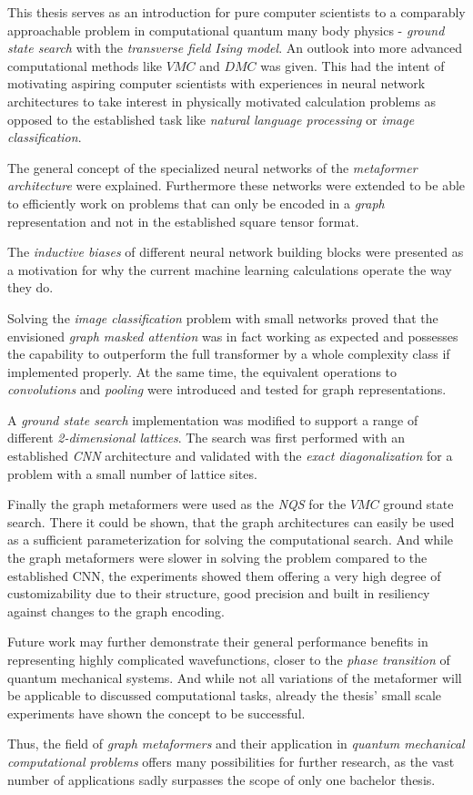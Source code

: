 This thesis serves as an introduction for pure computer scientists to a comparably approachable problem in computational quantum many body physics - \emph{ground state search} with the \emph{transverse field Ising model}.
An outlook into more advanced computational methods like $VMC$ and $DMC$ was given.
This had the intent of motivating aspiring computer scientists with experiences in neural network architectures to take interest in physically motivated calculation problems as opposed to the established task like \emph{natural language processing} or \emph{image classification}.

The general concept of the specialized neural networks of the \emph{metaformer architecture} were explained.
Furthermore these networks were extended to be able to efficiently work on problems that can only be encoded in a \emph{graph} representation and not in the established square tensor format.

The \emph{inductive biases} of different neural network building blocks were presented as a motivation for why the current machine learning calculations operate the way they do.

Solving the \emph{image classification} problem with small networks proved that the envisioned \emph{graph masked attention} was in fact working as expected and possesses the capability to outperform the full transformer by a whole complexity class if implemented properly.
At the same time, the equivalent operations to \emph{convolutions} and \emph{pooling} were introduced and tested for graph representations.

A \emph{ground state search} implementation was modified to support a range of different \emph{2-dimensional lattices}.
The search was first performed with an established \emph{CNN} architecture and validated with the \emph{exact diagonalization} for a problem with a small number of lattice sites.

Finally the graph metaformers were used as the \emph{NQS} for the $VMC$ ground state search.
There it could be shown, that the graph architectures can easily be used as a sufficient parameterization for solving the computational search.
And while the graph metaformers were slower in solving the problem compared to the established CNN, the experiments showed them offering a very high degree of customizability due to their structure, good precision and built in resiliency against changes to the graph encoding.

Future work may further demonstrate their general performance benefits in representing highly complicated wavefunctions, closer to the \emph{phase transition} of quantum mechanical systems.
And while not all variations of the metaformer will be applicable to discussed computational tasks, already the thesis' small scale experiments have shown the concept to be successful.

Thus, the field of \emph{graph metaformers} and their application in \emph{quantum mechanical computational problems} offers many possibilities for further research, as the vast number of applications sadly surpasses the scope of only one bachelor thesis.
